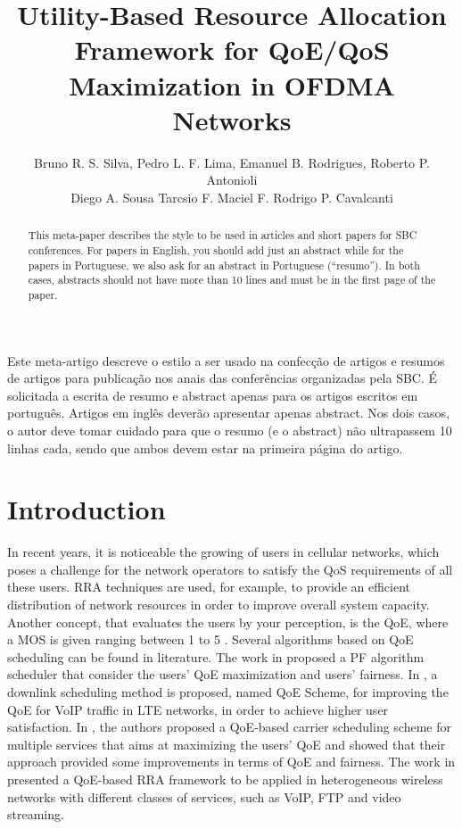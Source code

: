 \documentclass[12pt]{article}
\title{Utility-Based Resource Allocation Framework for QoE/QoS Maximization in OFDMA Networks}
\author{Bruno R. S. Silva\inst{1}, Pedro L. F. Lima\inst{1}, Emanuel B. Rodrigues\inst{2}, Roberto P. Antonioli \\ \inst{2} Diego A. Sousa\inst{2} Tarcsio F. Maciel\inst{2}
F. Rodrigo P. Cavalcanti\inst{2} }
\begin{document}
 

\maketitle

\begin{abstract}
  This meta-paper describes the style to be used in articles and short papers
  for SBC conferences. For papers in English, you should add just an abstract
  while for the papers in Portuguese, we also ask for an abstract in
  Portuguese (``resumo''). In both cases, abstracts should not have more than
  10 lines and must be in the first page of the paper.
\end{abstract}
     
\begin{resumo} 
  Este meta-artigo descreve o estilo a ser usado na confecção de artigos e
  resumos de artigos para publicação nos anais das conferências organizadas
  pela SBC. É solicitada a escrita de resumo e abstract apenas para os artigos
  escritos em português. Artigos em inglês deverão apresentar apenas abstract.
  Nos dois casos, o autor deve tomar cuidado para que o resumo (e o abstract)
  não ultrapassem 10 linhas cada, sendo que ambos devem estar na primeira
  página do artigo.
\end{resumo}

\section{Introduction}
In recent years, it is noticeable the growing of users in cellular networks, which poses a challenge for the network operators to satisfy the \ac{QoS} requirements of all these users. \ac{RRA} techniques are used, for example, to provide an efficient distribution of network resources in order to improve overall system capacity. Another concept, that evaluates the users by your perception, is the \ac{QoE}, where a \ac{MOS} is given ranging between 1 to 5 \cite{ITU1996}. 
Several algorithms based on \ac{QoE} scheduling can be found in literature. The work in \cite{cho2015qoe} proposed a \ac{PF} algorithm scheduler that consider the  users' \ac{QoE} maximization and users' fairness. In \cite{mushtaq2014qoe}, a downlink scheduling method is proposed, named QoE Scheme, for improving the \ac{QoE} for \ac{VoIP} traffic in \ac{LTE} networks, in order to achieve higher user satisfaction. In \cite{liu2012novel}, the authors proposed a \ac{QoE}-based carrier scheduling scheme for multiple services that aims at maximizing the users' \ac{QoE} and showed that their approach provided some improvements in terms of QoE and fairness. The work in \cite{toseef2011user} presented a \ac{QoE}-based \ac{RRA} framework to be applied in heterogeneous wireless networks with different classes of services, such as \ac{VoIP}, \ac{FTP} and video streaming. 
\end{document}
